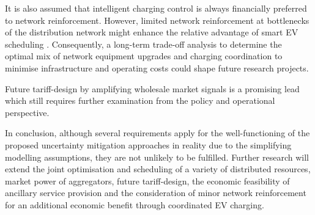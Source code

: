 It is also assumed that intelligent charging control is always financially preferred to network reinforcement. However, limited network reinforcement at bottlenecks of the distribution network might enhance the relative advantage of smart EV scheduling \cite{Papadopoulos2012}. Consequently, a long-term trade-off analysis to determine the optimal mix of network equipment upgrades and charging coordination to minimise infrastructure and operating costs could shape future research projects.

Future tariff-design by amplifying wholesale market signals is a promising lead which still requires further examination from the policy and operational perspective.

In conclusion, although several requirements apply for the well-functioning of the proposed uncertainty mitigation approaches in reality due to the simplifying modelling assumptions, they are not unlikely to be fulfilled. Further research will extend the joint optimisation and scheduling of a variety of distributed resources, market power of aggregators, future tariff-design, the economic feasibility of ancillary service provision and the consideration of minor network reinforcement for an additional economic benefit through coordinated EV charging.